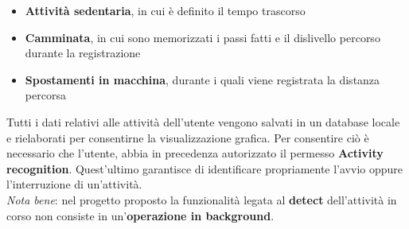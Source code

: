 \documentclass{article}
\begin{document}
\begin{itemize}
    \renewcommand{\labelitemi}{-}
    \item \textbf{Attività sedentaria}, in cui è definito il tempo trascorso
    \item \textbf{Camminata}, in cui sono memorizzati i passi fatti e il dislivello percorso durante la registrazione
    \item \textbf{Spostamenti in macchina}, durante i quali viene registrata la distanza percorsa
\end{itemize}
Tutti i dati relativi alle attività dell'utente vengono salvati in un database locale e rielaborati per consentirne la visualizzazione grafica. Per consentire ciò è necessario che l'utente, abbia in precedenza autorizzato il permesso \textbf{Activity recognition}. Quest'ultimo garantisce di identificare propriamente l'avvio oppure l'interruzione di un'attività. \vspace*{7pt}\\
\textit{Nota bene}: nel progetto proposto la funzionalità legata al \textbf{detect} dell'attività in corso non consiste in un'\textbf{operazione in background}.
\end{document}
